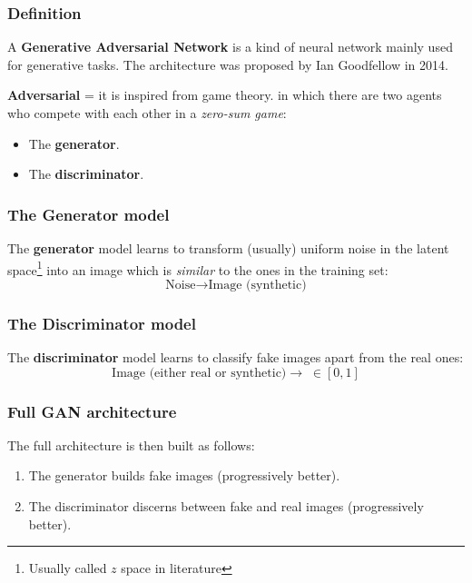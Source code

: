 \begin{frame}
    \frametitle{Definition}
    A \textbf{Generative Adversarial Network} is a kind of neural network mainly used for generative tasks. The architecture was proposed by Ian Goodfellow in 2014.

    \textbf{Adversarial} = it is inspired from game theory. in which there are two agents who compete with each other in a \emph{zero-sum game}:
    \begin{itemize}
        \item The \textbf{generator}.
        \item The \textbf{discriminator}.
    \end{itemize}
\end{frame}

\begin{frame}
    \frametitle{The Generator model}
    The \textbf{generator} model learns to transform (usually) uniform noise in the latent space\footnote{Usually called $z$ space in literature} into an image which is \emph{similar} to the ones in the training set:
    $$\text{Noise} \to \text{Image (synthetic)}$$
\end{frame}

\begin{frame}
    \frametitle{The Discriminator model}
    The \textbf{discriminator} model learns to classify fake images apart from the real ones:
    $$\text{Image (either real or synthetic)} \to \; \in [0,1]$$
\end{frame}

\begin{frame}
    \frametitle{Full GAN architecture}
    The full architecture is then built as follows:
    \begin{enumerate}
        \item The generator builds fake images (progressively better).
        \item The discriminator discerns between fake and real images (progressively better).
    \end{enumerate}
\end{frame}

